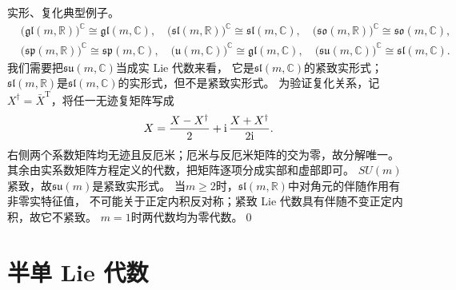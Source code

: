 \begin{example}
    实形、复化典型例子。
    \begin{align*}
        &\bigl(\mathfrak{gl}(m,\mathbb{R}) \bigr)^{\mathbb{C}} \cong \mathfrak{gl}(m,\mathbb{C}), \quad
        \bigl(\mathfrak{sl}(m,\mathbb{R}) \bigr)^{\mathbb{C}} \cong \mathfrak{sl}(m,\mathbb{C}), \quad
        \bigl(\mathfrak{so}(m,\mathbb{R}) \bigr)^{\mathbb{C}} \cong \mathfrak{so}(m,\mathbb{C}), \\
        &\bigl(\mathfrak{sp}(m,\mathbb{R}) \bigr)^{\mathbb{C}} \cong \mathfrak{sp}(m,\mathbb{C}), \quad
        \bigl(\mathfrak{u}(m,\mathbb{C}) \bigr)^{\mathbb{C}} \cong \mathfrak{gl}(m,\mathbb{C}), \quad
        \bigl(\mathfrak{su}(m,\mathbb{C}) \bigr)^{\mathbb{C}} \cong \mathfrak{sl}(m,\mathbb{C}).
    \end{align*}
    我们需要把$\mathfrak{su}(m,\mathbb{C})$当成实 Lie 代数来看，
    它是$\mathfrak{sl}(m,\mathbb{C})$的紧致实形式；
    $\mathfrak{sl}(m,\mathbb{R})$是$\mathfrak{sl}(m,\mathbb{C})$的实形式，但不是紧致实形式。
    为验证复化关系，记$X^\dagger=\bar X^{\mathrm T}$，将任一无迹复矩阵写成
    \[
        X=\frac{X-X^\dagger}{2}
          +\mathrm{i}\,\frac{X+X^\dagger}{2\mathrm{i}} .
    \]
    右侧两个系数矩阵均无迹且反厄米；厄米与反厄米矩阵的交为零，故分解唯一。
    其余由实系数矩阵方程定义的代数，把矩阵逐项分成实部和虚部即可。
    $SU(m)$紧致，故$\mathfrak{su}(m)$是紧致实形式。
    当$m\geqslant2$时，$\mathfrak{sl}(m,\mathbb R)$中对角元的伴随作用有非零实特征值，
    不可能关于正定内积反对称；紧致 Lie 代数具有伴随不变正定内积，故它不紧致。
    $m=1$时两代数均为零代数。\qed
\end{example}

\section{半单 Lie 代数}


